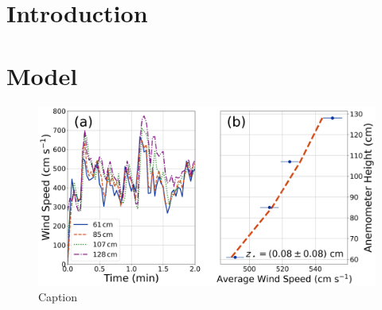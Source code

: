 \documentclass[linenumbers]{aastex631}
\begin{document}
\section{Introduction} \label{sec:Introduction}


\section{Model}



\begin{figure}
    \centering
    \includegraphics[width=\textwidth]{figures and data/Alamosa_Parking_Lot_Windspeeds.jpg}
    \caption{Caption}
    \label{fig:Alamosa_Parking_Lot_Windspeeds}
\end{figure}
\end{document}
